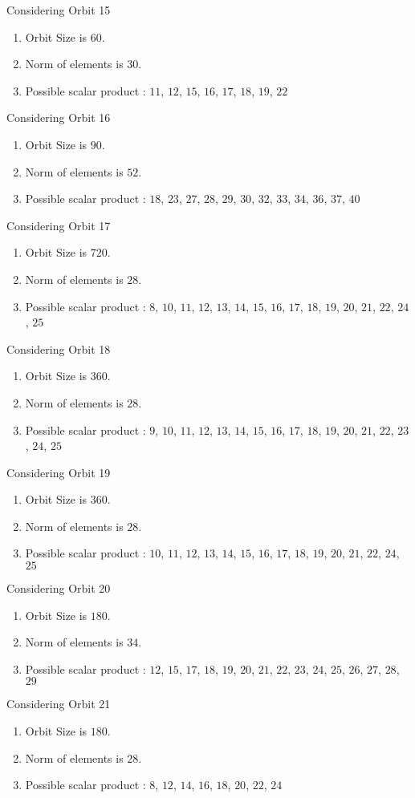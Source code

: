 \documentclass[12pt]{article}
\begin{document}
Considering Orbit 15
\begin{enumerate}
\item Orbit Size is $60$.
\item Norm of elements is $30$.
\item Possible scalar product : $11$, $12$, $15$, $16$, $17$, $18$, $19$, $22$
\end{enumerate}
Considering Orbit 16
\begin{enumerate}
\item Orbit Size is $90$.
\item Norm of elements is $52$.
\item Possible scalar product : $18$, $23$, $27$, $28$, $29$, $30$, $32$, $33$, $34$, $36$, $37$, $40$
\end{enumerate}
Considering Orbit 17
\begin{enumerate}
\item Orbit Size is $720$.
\item Norm of elements is $28$.
\item Possible scalar product : $8$, $10$, $11$, $12$, $13$, $14$, $15$, $16$, $17$, $18$, $19$, $20$, $21$, $22$, $24$, $25$
\end{enumerate}
Considering Orbit 18
\begin{enumerate}
\item Orbit Size is $360$.
\item Norm of elements is $28$.
\item Possible scalar product : $9$, $10$, $11$, $12$, $13$, $14$, $15$, $16$, $17$, $18$, $19$, $20$, $21$, $22$, $23$, $24$, $25$
\end{enumerate}
Considering Orbit 19
\begin{enumerate}
\item Orbit Size is $360$.
\item Norm of elements is $28$.
\item Possible scalar product : $10$, $11$, $12$, $13$, $14$, $15$, $16$, $17$, $18$, $19$, $20$, $21$, $22$, $24$, $25$
\end{enumerate}
Considering Orbit 20
\begin{enumerate}
\item Orbit Size is $180$.
\item Norm of elements is $34$.
\item Possible scalar product : $12$, $15$, $17$, $18$, $19$, $20$, $21$, $22$, $23$, $24$, $25$, $26$, $27$, $28$, $29$
\end{enumerate}
Considering Orbit 21
\begin{enumerate}
\item Orbit Size is $180$.
\item Norm of elements is $28$.
\item Possible scalar product : $8$, $12$, $14$, $16$, $18$, $20$, $22$, $24$
\end{enumerate}
\end{document}
